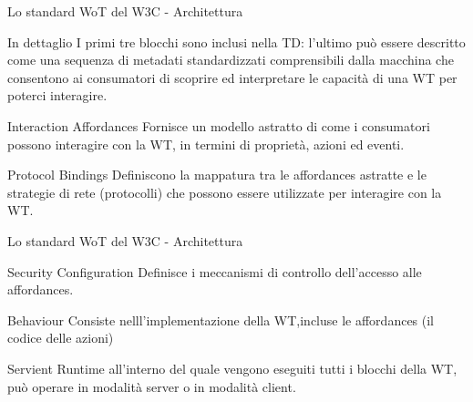 \documentclass{beamer}
\begin{document}
	\begin{frame}{Lo standard WoT del W3C - Architettura}
	\begin{block}{In dettaglio}
		I primi tre blocchi sono inclusi nella TD: l’ultimo può essere descritto come una sequenza di metadati
		standardizzati comprensibili dalla macchina che consentono ai consumatori di scoprire ed interpretare
		le capacità di una WT per poterci interagire.
	\end{block}
 \begin{block}{Interaction Affordances}
	Fornisce un modello astratto di come i consumatori possono interagire con la WT, in termini di proprietà, azioni ed eventi.
\end{block}

\begin{block}{Protocol Bindings}
	Definiscono la mappatura tra le affordances astratte e le strategie di rete (protocolli) che possono essere utilizzate per interagire con la WT.
\end{block}


	
\end{frame}

\begin{frame}{Lo standard WoT del W3C - Architettura}
	\begin{block}{Security Configuration}
		Definisce i meccanismi di controllo dell'accesso alle affordances.
	\end{block}
	\begin{block}{Behaviour}
		 Consiste nelll’implementazione della WT,incluse le affordances (il codice delle azioni)
	\end{block}
	\begin{block}{Servient}
		Runtime all'interno del quale vengono eseguiti tutti i blocchi della WT, può operare in modalità server o in modalità client.
	\end{block}
\end{frame}
\end{document}
